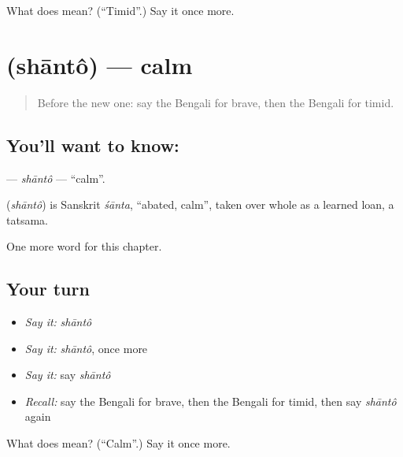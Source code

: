 \begin{tcolorbox}[breakable,colback=teal!4,colframe=teal!35!black,title={Before you move on}]
What does  mean? (\textquotedblleft{}Timid\textquotedblright{}.) Say it once more.
\end{tcolorbox}
\section[\texorpdfstring{\bn{শান্ত} (shāntô)}{শান্ত (shāntô)}]{ (shāntô) — calm}

\label{lesson:BN-C139-shanto}



\begin{quote}
Before the new one: say the Bengali for brave, then the Bengali for timid.
\end{quote}

\subsection*{You'll want to know: }
\textbf{} — \emph{shāntô} — \textquotedblleft{}calm\textquotedblright{}.

\begin{cousinweb}
\textbf{} (\emph{shāntô}) is Sanskrit \emph{śānta}, \textquotedblleft{}abated, calm\textquotedblright{}, taken over whole as a learned loan, a tatsama.
\end{cousinweb}

\begin{grammarlens}[title={What you've built}]
One more word for this chapter.
\end{grammarlens}

\subsection*{Your turn}
\begin{itemize}
\raggedright
  \item \emph{Say it:} \emph{shāntô}
  \item \emph{Say it:} \emph{shāntô}, once more
  \item \emph{Say it:} say \emph{shāntô}
  \item \emph{Recall:} say the Bengali for brave, then the Bengali for timid, then say \emph{shāntô} again
\end{itemize}

\begin{tcolorbox}[breakable,colback=teal!4,colframe=teal!35!black,title={Before you move on}]
What does  mean? (\textquotedblleft{}Calm\textquotedblright{}.) Say it once more.
\end{tcolorbox}
